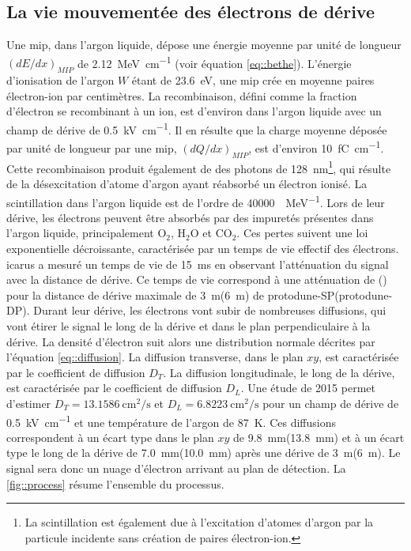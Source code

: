     \subsection{La vie mouvementée des électrons de dérive}
        Une \gls{mip}, dans l'argon liquide, dépose une énergie moyenne par unité de longueur $(dE/dx)_{MIP}$ de \SI{2.12}{\mega\electronvolt\per\centi\meter} (voir équation \eqref{eq::bethe}). L'énergie d'ionisation de l'argon $W$ étant de \SI{23.6}{\eV}, une \gls{mip} crée en moyenne  paires électron-ion par centimètres.
        La recombinaison, défini comme la fraction d'électron se recombinant à un ion, est d'environ  dans l'argon liquide avec un champ de dérive de \SI{0.5}{\kilo\volt\per\centi\meter}. Il en résulte que la charge moyenne déposée par unité de longueur par une \gls{mip}, $(dQ/dx)_{MIP}$, est d'environ \SI{10}{\femto\coulomb\per\centi\meter}. Cette recombinaison produit également de des photons de \SI{128}{\nano\meter}\footnote{La scintillation est également due à l'excitation d'atomes d'argon par la particule incidente sans création de paires électron-ion.}, qui résulte de la désexcitation d'atome d'argon ayant réabsorbé un électron ionisé. La scintillation dans l'argon liquide est de l'ordre de \SI{40000}{\gamma\per\mega\eV}\cite{Cennini1999}. Lors de leur dérive, les électrons peuvent être absorbés par des impuretés présentes dans l'argon liquide, principalement O$_2$, H$_2$O et CO$_2$. Ces pertes suivent une loi exponentielle décroissante, caractérisée par un temps de vie effectif des électrons. \gls{icarus} a mesuré un temps de vie de \SI{15}{\milli\second}\cite{Antonello2014} en observant l'atténuation du signal avec la distance de dérive. Ce temps de vie correspond à une atténuation de () pour la distance de dérive maximale de \SI{3}{\meter}(\SI{6}{\meter}) de proto\gls{dune}-SP(proto\gls{dune}-DP). Durant leur dérive, les électrons vont subir de nombreuses diffusions, qui vont étirer le signal le long de la dérive et dans le plan perpendiculaire à la dérive. La densité d'électron suit alors une distribution normale décrites par l'équation \eqref{eq::diffusion}. La diffusion transverse, dans le plan $xy$, est caractérisée par le coefficient de diffusion $D_T$. La diffusion longitudinale, le long de la dérive, est caractérisée par le coefficient de diffusion $D_L$. Une étude de 2015\cite{Li2015} permet d'estimer $D_T=\SI{13.1586}{\centi\meter\squared\per\second}$ et $D_L=\SI{6.8223}{\centi\meter\squared\per\second}$ pour un champ de dérive de \SI{0.5}{\kilo\volt\per\centi\meter} et une température de l'argon de \SI{87}{\kelvin}. Ces diffusions correspondent à un écart type dans le plan $xy$ de \SI{9.8}{\milli\meter}(\SI{13.8}{\milli\meter}) et à un écart type le long de la dérive de \SI{7.0}{\milli\meter}(\SI{10.0}{\milli\meter}) après une dérive de \SI{3}{\meter}(\SI{6}{\meter}). Le signal sera donc un nuage d'électron arrivant au plan de détection. La \autoref{fig::process} résume l'ensemble du processus.

